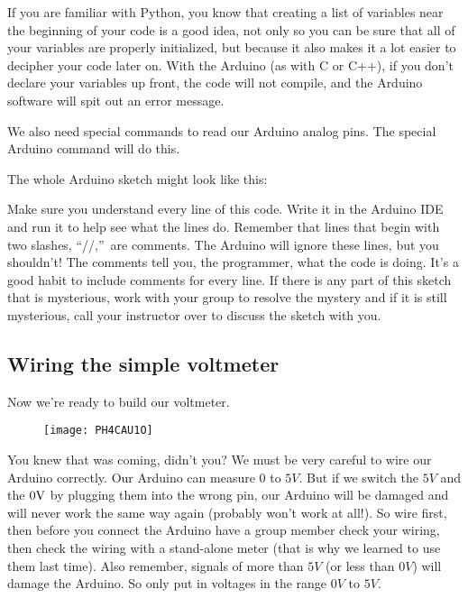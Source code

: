 If you are familiar with Python, you know that creating a list of variables
near the beginning of your code is a good idea, not only so you can be sure
that all of your variables are properly initialized, but because it also makes
it a lot easier to decipher your code later on. With the Arduino (as with C or 
C++), if you don't declare your variables up front, the code will not compile, 
and the Arduino software will spit out an error message.

We also need special commands to read our Arduino analog pins. The special
Arduino command   
will do this.

The whole Arduino sketch might look like this:


Make sure you understand every line of this code. Write it in the Arduino
IDE and run it to help see what the lines do. Remember that lines that 
begin with two
slashes, \textquotedblleft //,\textquotedblright\ are comments. The Arduino
will ignore these lines, but you shouldn't! The comments tell you, the
programmer, what the code is doing. It's a good habit to include comments
for every line. If there is any part of this sketch that is mysterious, work
with your group to resolve the mystery and if it is still mysterious, call
your instructor over to discuss the sketch with you.

\subsection{Wiring the simple voltmeter}

Now we're ready to build our voltmeter.

\begin{figure*}[h!]
\centering
\texttt{[image: PH4CAU1O]}
\end{figure*}
You knew that was coming, didn't
you? We must be very careful to wire our Arduino correctly. Our Arduino can
measure $0$ to $5\unit{V}.$ But if we switch the $5\unit{V}$ and the $0\unit{%
V}$ by plugging them into the wrong pin, our Arduino will be damaged and
will never work the same way again (probably won't work at all!). So wire
first, then before you connect the Arduino have a group member check your
wiring, then check the wiring with a stand-alone meter (that is why we
learned to use them last time). Also remember, signals of more than 
$5\unit{V}$ (or less than $0\unit{V}$) will 
damage the Arduino. So only put in voltages in the range $0\unit{V}$ to $5%
\unit{V}.$


